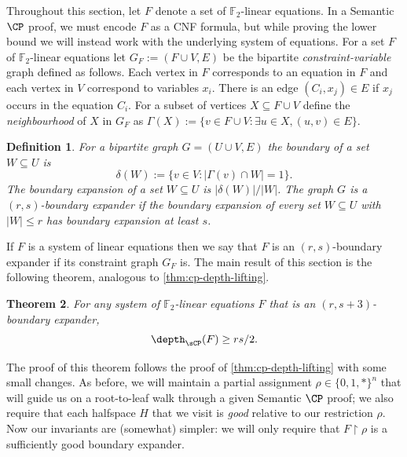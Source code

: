 \documentclass[11pt]{article}
\newtheorem{theorem}{Theorem}[section]
\newtheorem{definition}[theorem]{Definition}
\begin{document}
Throughout this section, let $F$ denote a set of $\mathbb{F}_2$-linear equations.
In a Semantic $\CP$ proof, we must encode $F$ as a CNF formula, but while proving the lower bound we will instead work with the underlying system of equations.
For a set $F$ of $\mathbb{F}_2$-linear equations let $G_F := (F \cup V, E)$ be the bipartite \emph{constraint-variable} graph defined as follows. 
Each vertex in $F$ corresponds to an equation in $F$ and each vertex in $V$ correspond to variables $x_i$. 
There is an edge $(C_i,x_j) \in E$ if $x_j$ occurs in the equation $C_i$.
For a subset of vertices $X \subseteq F \cup V$ define the \emph{neighbourhood} of $X$ in $G_F$ as $\Gamma(X):= \{v \in F \cup V : \exists u \in X, (u,v) \in E\}$.

\begin{definition}\label{def:expansion}
	For a bipartite graph $G=(U \cup V, E)$ the \emph{boundary} of a set $W \subseteq U$ is \[\delta(W):= \{v \in V : |\Gamma(v) \cap W| = 1\}.\]
	The \emph{boundary expansion} of a set $W \subseteq U$ is $|\delta(W)|/|W|$. 
	The graph $G$ is a $(r, s)$-\emph{boundary expander} if the boundary expansion of every set $W \subseteq U$ with $|W| \leq r$ has boundary expansion at least $s$.
\end{definition}

If $F$ is a system of linear equations then we say that $F$ is an $(r,s)$-boundary expander if its constraint graph $G_{F}$ is.
The main result of this section is the following theorem, analogous to \autoref{thm:cp-depth-lifting}.


\begin{theorem}\label{thm:expander-lb}
	For any system of $\mathbb{F}_2$-linear equations $F$ that is an $(r, s+3)$-boundary expander, \[\depth_{\sCP}(F) \geq rs/2.\]
\end{theorem}


The proof of this theorem follows the proof of \autoref{thm:cp-depth-lifting} with some small changes.
As before, we will maintain a partial assignment $\rho \in \{0,1,*\}^n$ that will guide us on a root-to-leaf walk through a given Semantic $\CP$ proof; we also require that each halfspace $H$ that we visit is \emph{good} relative to our restriction $\rho$.
Now our invariants are (somewhat) simpler: we will only require that $F \restriction \rho$ is a sufficiently good boundary expander.
\end{document}
